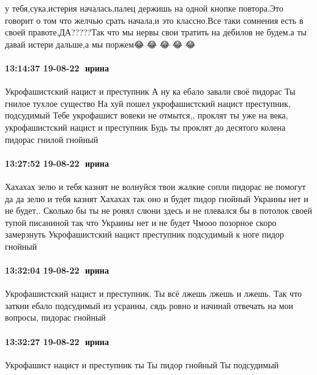 у тебя,сука,истерия началась,палец держишь на одной кнопке повтора.Это говорит
о том что желчью срать начала,и это классно.Все таки сомнения есть в своей
правоте,ДА?????Так что мы нервы свои тратить на дебилов не будем.а ты давай
истери дальше,а мы поржем😂 😂 😂 😂 😂

\paragraph{13:14:37 19-08-22 🍏ирина 🍇🍇}

Укрофашистский нацист и преступник
А ну ка ебало завали своё пидорас
Ты гнилое тухлое существо
На хуй пошел укрофашистский нацист преступник, подсудимый
Тебе укрофашист вовеки не отмытся,, проклят ты уже на века, укрофашистский нацист и преступник
Будь ты проклят до десятого колена пидорас гнилой гнойный

\paragraph{13:27:52 19-08-22 🍏ирина 🍇🍇}

Хахахах зелю и тебя казнят не волнуйся твои жалкие сопли пидорас не помогут да да зелю и тебя казнят
Хахахах так оно и будет пидор гнойный
Украины нет и не будет,.
Сколько бы ты не ронял слюни здесь и не плевался бы в потолок своей тупой писаниной так что
Украины нет и не будет
Чмооо позорное скоро замерзнуть
Укрофашистский нацист преступник подсудимый к ноге пидор гнойный

\paragraph{13:32:04 19-08-22 🍏ирина 🍇🍇}

Укрофашистский нацист и преступник.
Ты всё лжешь лжешь и лжешь.
Так что заткни ебало подсудимый из усраины, сядь ровно и начинай отвечать на мои вопросы, пидорас гнойный

\paragraph{13:32:27 19-08-22 🍏ирина 🍇🍇}

Укрофашист нацист и преступник ты
Ты пидор гнойный
Ты подсудимый
